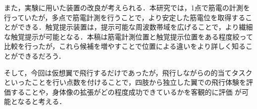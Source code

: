 \begin{small}
    また，実験に用いた装置の改良が考えられる．本研究では，1点で筋電の計測を行っていたが，多点で筋電計測を行うことで，より安定した筋電位を取得することができる\cite{白石恵1992筋電位多点計測による体幹背部の神経支配帯の分布}．触覚提示装置は，提示可能な周波数帯域を広げることで，より繊細な触覚提示が可能となる．本稿は筋電計測位置と触覚提示位置をある程度絞って比較を行ったが，これら候補を増やすことで位置による違いをより詳しく知ることができるだろう．

    そして，今回は仮想翼で飛行するだけであったが，飛行しながらの的当てタスクといったことを行い点数を付けることで，四肢から独立した翼での飛行体験を評価することや，身体像の拡張がどの程度成功できているかを客観的に評価
    が可能となると考える．
  


{
\scriptsize %


}

\end{small}

